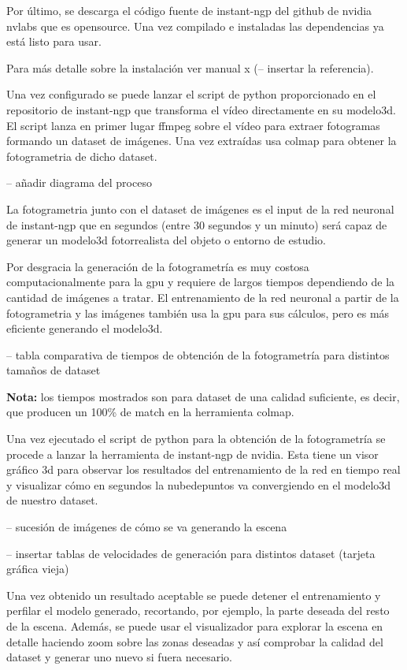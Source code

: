 \documentclass[a4paper, 12pt, spanish, twoside]{article}
\begin{document}
Por último, se descarga el código fuente de \gls{instant-ngp} del \gls{github} de \gls{nvidia} \gls{nvlabs} que es \gls{opensource}. Una vez compilado e instaladas las dependencias ya está listo para usar. 

Para más detalle sobre la instalación ver manual x (-- insertar la referencia). 

Una vez configurado se puede lanzar el script de \Gls{python} proporcionado en el repositorio de \gls{instant-ngp} que transforma el vídeo directamente en su \gls{modelo3d}. El script lanza en primer lugar \gls{ffmpeg} sobre el vídeo para extraer fotogramas formando un \gls{dataset} de imágenes. Una vez extraídas usa \gls{colmap} para obtener la \gls{fotogrametria} de dicho \gls{dataset}.  

-- añadir diagrama del proceso 

La \gls{fotogrametria} junto con el \gls{dataset} de imágenes es el input de la red neuronal de \gls{instant-ngp} que en segundos (entre 30 segundos y un minuto) será capaz de generar un \gls{modelo3d} fotorrealista del objeto o entorno de estudio. 

Por desgracia la generación de la fotogrametría es muy costosa computacionalmente para la \acrshort{gpu} y requiere de largos tiempos dependiendo de la cantidad de imágenes a tratar. El entrenamiento de la red neuronal a partir de la \gls{fotogrametria} y las imágenes también usa la \acrshort{gpu} para sus cálculos, pero es más eficiente generando el \gls{modelo3d}.  

-- tabla comparativa de tiempos de obtención de la fotogrametría para distintos tamaños de dataset 

\textbf{Nota:} los tiempos mostrados son para \gls{dataset} de una calidad suficiente, es decir, que producen un 100\% de match en la herramienta \gls{colmap}. 

Una vez ejecutado el script de \gls{python} para la obtención de la fotogrametría se procede a lanzar la herramienta de \gls{instant-ngp} de \gls{nvidia}. Esta tiene un visor gráfico \acrshort{3d} para observar los resultados del entrenamiento de la red en tiempo real y visualizar cómo en segundos la \gls{nubedepuntos} va convergiendo en el \gls{modelo3d} de nuestro \gls{dataset}.  

-- sucesión de imágenes de cómo se va generando la escena 

-- insertar tablas de velocidades de generación para distintos dataset (tarjeta gráfica vieja) 

Una vez obtenido un resultado aceptable se puede detener el entrenamiento y perfilar el modelo generado, recortando, por ejemplo, la parte deseada del resto de la escena. Además, se puede usar el visualizador para explorar la escena en detalle haciendo zoom sobre las zonas deseadas y así comprobar la calidad del \gls{dataset} y generar uno nuevo si fuera necesario. 
\end{document}
